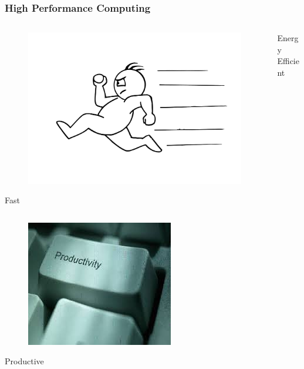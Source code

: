 \begin{frame}
  \frametitle{High Performance Computing}
  \begin{columns}
    \begin{column}{.5\textwidth}
      \begin{center}
        \begin{figure}
          \includegraphics[scale=0.1, clip=true, trim=0 200 50 250]{figs/fast.jpg}\\
        \end{figure}
        Fast
      \end{center}
    \end{column}
    \begin{column}{.5\textwidth}
      \begin{center}
        \begin{figure}[!ht]
          \def\svgwidth{0.6\linewidth}
          
        \end{figure}
        Energy Efficient
      \end{center}
    \end{column}
  \end{columns}
  \begin{center}
    \begin{figure}
      \includegraphics[scale=0.3]{figs/productive.jpg}\\
    \end{figure}
    Productive
  \end{center}

\end{frame}

